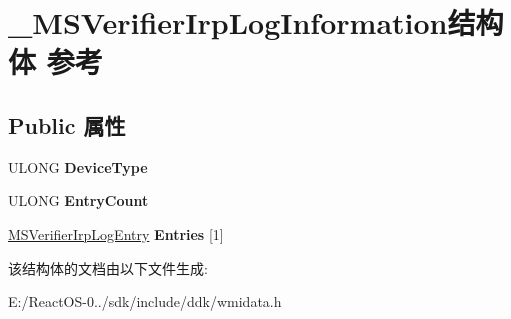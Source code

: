\hypertarget{struct___m_s_verifier_irp_log_information}{}\section{\+\_\+\+M\+S\+Verifier\+Irp\+Log\+Information结构体 参考}
\label{struct___m_s_verifier_irp_log_information}
\subsection*{Public 属性}
\begin{DoxyCompactItemize}
\item 
\mbox{\label{struct___m_s_verifier_irp_log_information_aa2629973fb545100fe0263cd9451e6c6}} 
U\+L\+O\+NG {\bfseries Device\+Type}
\item 
\mbox{\label{struct___m_s_verifier_irp_log_information_a725492be25a5a46aa4767ea059cd109c}} 
U\+L\+O\+NG {\bfseries Entry\+Count}
\item 
\mbox{\label{struct___m_s_verifier_irp_log_information_aa2539665d37da184735c39bc3b89d577}} 
\hyperlink{struct___m_s_verifier_irp_log_entry}{M\+S\+Verifier\+Irp\+Log\+Entry} {\bfseries Entries} \mbox{[}1\mbox{]}
\end{DoxyCompactItemize}


该结构体的文档由以下文件生成\+:\begin{DoxyCompactItemize}
\item 
E\+:/\+React\+O\+S-\/0../sdk/include/ddk/wmidata.\+h\end{DoxyCompactItemize}
